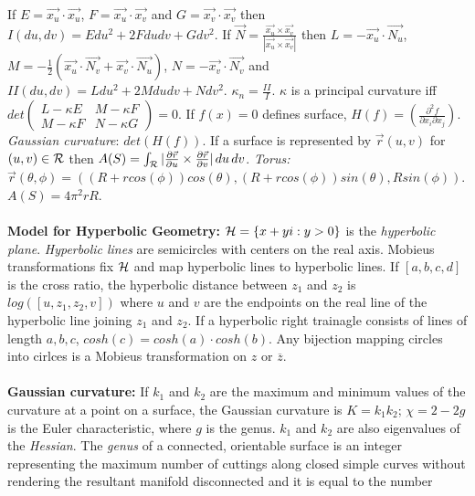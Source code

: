 If $E= {\vec {x_u}} \cdot {\vec {x_u}}$,
$F= {\vec {x_u}} \cdot {\vec {x_v}}$ and
$G= {\vec {x_v}} \cdot {\vec {x_v}}$ then $I(du, dv)= E du^2 + 2F du dv + G dv^2$.
If ${\vec N}= {\frac { {\vec {x_u}} \times {\vec {x_v}} }
{| {\vec {x_u}} \times {\vec {x_v}} |} }$ then
$L= -{\vec {x_u}} \cdot {\vec {N_u}}$,
$M= -{\frac 1 2}(
{\vec {x_u}} \cdot {\vec {N_v}} + {\vec {x_v}} \cdot {\vec {N_u}})$,
$N= -{\vec {x_v}} \cdot {\vec {N_v}}$ and $II(du,dv)= L du^2 + 2M du dv +N dv^2$.
$\kappa_n= {\frac {II} {I}}$.  $\kappa$ is a principal curvature iff
$det \left(
\begin{array}{cc}
L- \kappa E &  M - \kappa F \\
M - \kappa F &  N - \kappa G
\end{array}
\right) =0$.  
If $f(x)=0$ defines surface, $H(f)= ({\frac {\partial^2 f} {\partial x_i \partial x_j}})$.
\emph{Gaussian curvature}: $det(H(f))$.
If a surface is represented by ${\vec r}(u,v)$ for $(u,v) \in {\cal R}$ then
$A(S)= \int_{{\cal R}} 
|{\frac {\partial {\vec r}} {\partial u}} \times
{\frac {\partial {\vec r}} {\partial v}}| \thinspace du \thinspace dv
$.  \emph{Torus:} ${\vec r}( \theta, \phi)= (
(R+r cos(\phi)) cos(\theta),
(R+r cos(\phi)) sin(\theta), R sin(\phi)) $.  $A(S)= 4 \pi^2 rR$.
\\
\\
{\bf Model for Hyperbolic Geometry:}
${\cal H}= \{ x+yi: y>0 \}$ is the \emph{hyperbolic plane}.  \emph{Hyperbolic lines} are
semicircles with centers on the real axis.  Mobieus transformations fix ${\cal H}$ and
map hyperbolic lines to hyperbolic lines. If $[a,b,c,d]$ is the cross ratio, the hyperbolic distance between
$z_1$ and $z_2$ is $log([u,z_1, z_2, v])$ where $u$ and $v$ are the endpoints on the real line of
the hyperbolic line joining $z_1$ and $z_2$.  If a hyperbolic right trainagle consists of lines
of length $a, b, c$, $cosh(c)= cosh(a) \cdot cosh(b)$.  Any bijection mapping circles into cirlces is
a Mobieus transformation on $z$ or ${\overline z}$.
\\
\\
{\bf Gaussian curvature:} If $k_1$ and $k_2$ are the maximum and minimum values
of the curvature at a point on a surface, the Gaussian curvature is $K= k_1 k_2$;
$\chi=2-2g$ is the Euler characteristic, where $g$ is the genus.  $k_1$ and $k_2$ are
also eigenvalues of the \emph{Hessian}.
The \emph{genus} of a connected, orientable surface is an 
integer representing the maximum number of cuttings along closed simple curves without 
rendering the resultant manifold disconnected and it is equal to the number 
